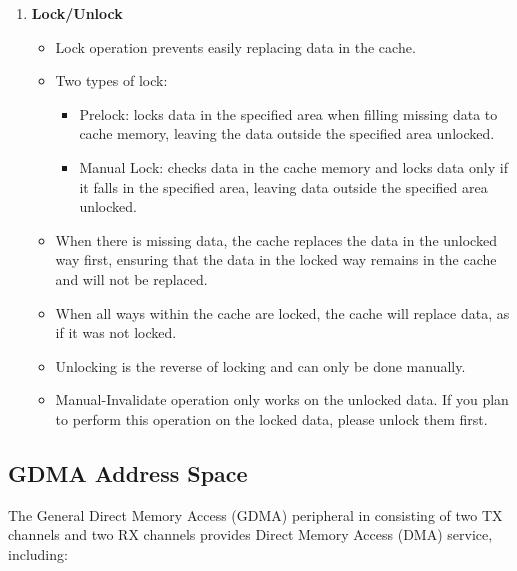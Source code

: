 \documentclass[main\_\_EN.tex]{subfiles}
\begin{document}
\begin{enumerate}
\item \textbf{Lock/Unlock}
\begin{itemize}
    \item Lock operation prevents easily replacing data in the cache.
    \item Two types of lock:
    \begin{itemize}
    \item Prelock: locks data in the specified area when filling missing data to cache memory, leaving the data outside the specified area unlocked.
    \item Manual Lock: checks data in the cache memory and locks data only if it falls in the specified area, leaving data outside the specified area unlocked.
    \end{itemize}
    \item When there is missing data, the cache replaces the data in the unlocked way first, ensuring that the data in the locked way remains in the cache and will not be replaced.
    \item When all ways within the cache are locked, the cache will replace data, as if it was not locked.
    \item Unlocking is the reverse of locking and can only be done manually.
    \item Manual-Invalidate operation only works on the unlocked data. If you plan to perform this operation on the locked data, please unlock them first.
    
\end{itemize}
\end{enumerate}

\subsection{GDMA Address Space}

The General Direct Memory Access (GDMA) peripheral in \chipname{} consisting of two TX channels and two RX channels provides Direct Memory Access (DMA) service, including:
\end{document}
